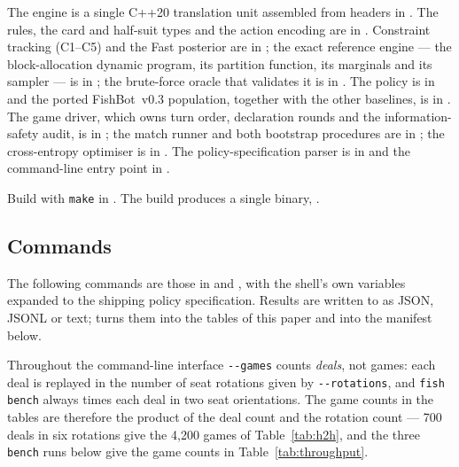 \documentclass[11pt]{article}
\theoremstyle{definition}
\DeclareRobustCommand{\vthree}{\texorpdfstring{\mbox{FishBot v0.3}}{FishBot v0.3}}
\newcommand{\numHtHGames}{4{,}200}
\newcommand{\numHtHDeals}{700}
\begin{document}
The engine is a single C++20 translation unit assembled from headers in
. The rules, the card and half-suit types and the action
encoding are in . Constraint tracking (C1--C5) and the
Fast posterior are in ; the exact reference engine
--- the block-allocation dynamic program, its partition function, its marginals
and its sampler --- is in ; the brute-force oracle
that validates it is in . The policy is in
 and the ported \vthree{} population, together with the
other baselines, is in . The game driver, which
owns turn order, declaration rounds and the information-safety audit, is in
; the match runner and both bootstrap procedures are
in ; the cross-entropy optimiser is in
. The policy-specification parser is in
 and the command-line entry point in
.

Build with \verb|make| in . The build produces a single binary,
.

\subsection{Commands}
\label{app:repro-commands}

The following commands are those in  and
, with the shell's own variables expanded to the
shipping policy specification. Results are written to
 as JSON, JSONL or text;
 turns them into the tables of this paper and
 into the manifest below.

Throughout the command-line interface \texttt{-{}-games} counts \emph{deals},
not games: each deal is replayed in the number of seat rotations given by
\texttt{-{}-rotations}, and \texttt{fish bench} always times each deal in two
seat orientations. The game counts in the tables are therefore the product of
the deal count and the rotation count --- \numHtHDeals{} deals in six rotations
give the \numHtHGames{} games of Table~\ref{tab:h2h}, and the three
\texttt{bench} runs below give the game counts in Table~\ref{tab:throughput}.
\end{document}
